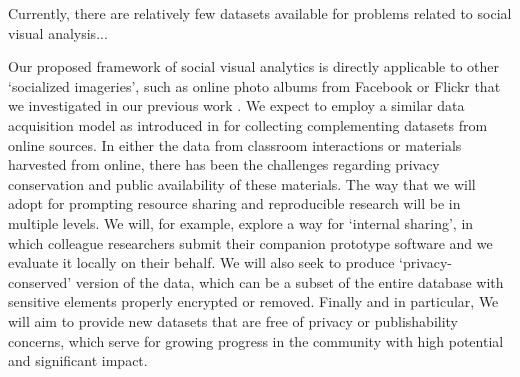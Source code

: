 Currently, there are relatively few datasets available for problems related to social visual analysis...

Our proposed framework of social visual analytics is directly applicable to other `socialized imageries', such as online photo albums from Facebook or Flickr that we investigated in our previous work \cite{Stone2008,Stone2010}. We expect to employ a similar data acquisition model as introduced in \cite{Stone2008,Stone2010} for collecting complementing datasets from online sources.  In either the data from classroom interactions or materials harvested from online, there has been the challenges regarding privacy conservation and public availability of these materials. The way that we will adopt for prompting resource sharing and reproducible research will be in multiple levels. We will, for example, explore a way for `internal sharing', in which colleague researchers submit their companion prototype software and we evaluate it locally on their behalf. We will also seek to produce `privacy-conserved' version of the data, which can be a subset of the entire database with sensitive elements properly encrypted or removed. Finally and in particular, We will aim to provide new datasets that are free of privacy or publishability concerns, which serve for growing progress in the community with high potential and significant impact.









